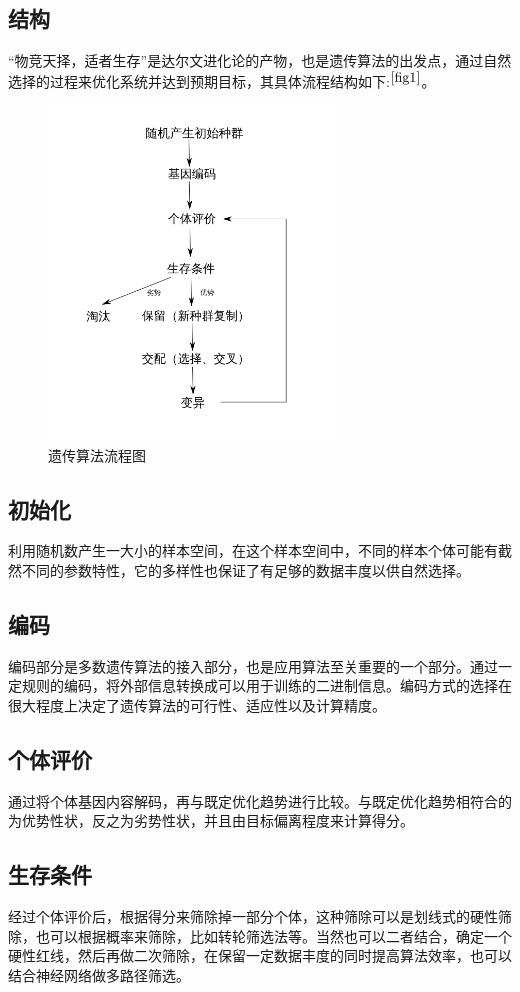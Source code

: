 \documentclass[14pt, a4paper]{article}
\begin{document}
    \subsection{结构}
        “物竞天择，适者生存”是达尔文进化论的产物，也是遗传算法的出发点，通过自然选择的过程来优化系统并达到预期目标，其具体流程结构如下:$^{\ref{fig1}}$。
    \begin{figure}[htbp]
        \centering
        \includegraphics[width = 3in]{fig/遗传算法.png}
        \caption{遗传算法流程图}
        \label{fig1}
    \end{figure}
    \subsection{初始化}
        利用随机数产生一大小的样本空间，在这个样本空间中，不同的样本个体可能有截然不同的参数特性，它的多样性也保证了有足够的数据丰度以供自然选择。
    \subsection{编码}
        编码部分是多数遗传算法的接入部分，也是应用算法至关重要的一个部分。通过一定规则的编码，将外部信息转换成可以用于训练的二进制信息。编码方式的选择在很大程度上决定了遗传算法的可行性、适应性以及计算精度。
    \subsection{个体评价}
        通过将个体基因内容解码，再与既定优化趋势进行比较。与既定优化趋势相符合的为优势性状，反之为劣势性状，并且由目标偏离程度来计算得分。
    \subsection{生存条件}
        经过个体评价后，根据得分来筛除掉一部分个体，这种筛除可以是划线式的硬性筛除，也可以根据概率来筛除，比如转轮筛选法等。当然也可以二者结合，确定一个硬性红线，然后再做二次筛除，在保留一定数据丰度的同时提高算法效率，也可以结合神经网络做多路径筛选。
\end{document}
